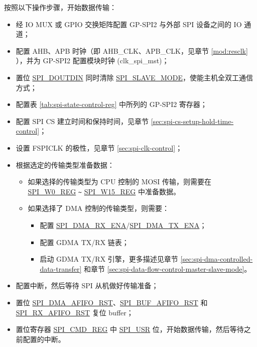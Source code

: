 \documentclass[main\_\_CN.tex]{subfiles}
\begin{document}
按照以下操作步骤，开始数据传输：
\begin{itemize}
    \item 经 IO MUX 或 GPIO 交换矩阵配置 GP-SPI2 与外部 SPI 设备之间的 IO 通道；
    \item 配置 AHB、APB 时钟（即 AHB\_CLK、APB\_CLK，见章节  \ref{mod:resclk} \textit{}），并为 GP-SPI2 配置模块时钟 (clk\_spi\_mst)；
    \item 置位 \hyperref[fielddesc:SPIDOUTDIN]{SPI\_DOUTDIN} 同时清除 \hyperref[fielddesc:SPISLAVEMODE]{SPI\_SLAVE\_MODE}，使能主机全双工通信方式；

    \item 配置表  \ref{tab:spi-state-control-reg} 中所列的 GP-SPI2 寄存器；

    \item 配置 SPI CS 建立时间和保持时间，见章节  \ref{sec:spi-cs-setup-hold-time-control}；

    \item 设置 FSPICLK 的极性，见章节  \ref{sec:spi-clk-control}；

    \item 根据选定的传输类型准备数据：
    \begin{itemize}
        \item 如果选择的传输类型为 CPU 控制的 MOSI 传输，则需要在 \hyperref[regdesc:SPIW0REG]{SPI\_W0\_REG} \verb+~+ \hyperref[regdesc:SPIW0REG]{SPI\_W15\_REG} 中准备数据。

        \item 如果选择了 DMA 控制的传输类型，则需要：
        \begin{itemize}
            \item 配置 \hyperref[fielddesc:SPIDMARXENA]{SPI\_DMA\_RX\_ENA}/\hyperref[fielddesc:SPIDMATXENA]{SPI\_DMA\_TX\_ENA}；
            \item 配置 GDMA TX/RX 链表；
            \item 启动 GDMA TX/RX 引擎，更多描述见章节  \ref{sec:spi-dma-controlled-data-transfer} 和章节  \ref{sec:spi-data-flow-control-master-slave-mode}。
        \end{itemize}
    \end{itemize}

    \item 配置中断，然后等待 SPI 从机做好传输准备；

    \item 置位 \hyperref[fielddesc:SPIDMAAFIFORST]{SPI\_DMA\_AFIFO\_RST}、\hyperref[fielddesc:SPIBUFAFIFORST]{SPI\_BUF\_AFIFO\_RST} 和 \hyperref[fielddesc:SPIRXAFIFORST]{SPI\_RX\_AFIFO\_RST} 复位 buffer；

    \item 置位寄存器 \hyperref[regdesc:SPICMDREG]{SPI\_CMD\_REG} 中 \hyperref[fielddesc:SPIUSR]{SPI\_USR} 位，开始数据传输，然后等待之前配置的中断。

\end{itemize}
\end{document}
